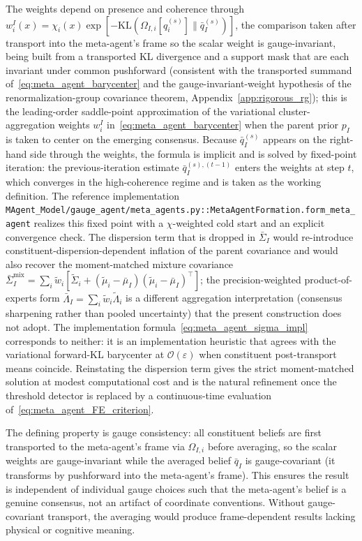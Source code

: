 \documentclass[11pt]{article}
\begin{document}
The weights depend on presence and coherence through $w_i^I(x) = \chi_i(x) \exp[-\mathrm{KL}(\Omega_{I,i}[q_i^{(s)}] \| \bar{q}_I^{(s)})]$, the comparison taken after transport into the meta-agent's frame so the scalar weight is gauge-invariant, being built from a transported KL divergence and a support mask that are each invariant under common pushforward (consistent with the transported summand of~\eqref{eq:meta_agent_barycenter} and the gauge-invariant-weight hypothesis of the renormalization-group covariance theorem, Appendix~\ref{app:rigorous_rg}); this is the leading-order saddle-point approximation of the variational cluster-aggregation weights $w_i^I$ in~\eqref{eq:meta_agent_barycenter} when the parent prior $p_I$ is taken to center on the emerging consensus. Because $\bar{q}_I^{(s)}$ appears on the right-hand side through the weights, the formula is implicit and is solved by fixed-point iteration: the previous-iteration estimate $\bar{q}_I^{(s),(t-1)}$ enters the weights at step $t$, which converges in the high-coherence regime and is taken as the working definition. The reference implementation \texttt{MAgent\_Model/gauge\_agent/meta\_agents.py::MetaAgentFormation.form\_meta\_agent} realizes this fixed point with a $\chi$-weighted cold start and an explicit convergence check. The dispersion term that is dropped in $\bar{\Sigma}_I$ would re-introduce constituent-dispersion-dependent inflation of the parent covariance and would also recover the moment-matched mixture covariance $\bar{\Sigma}_I^{\mathrm{mix}} = \sum_i \tilde{w}_i[\tilde{\Sigma}_i + (\tilde{\mu}_i - \bar{\mu}_I)(\tilde{\mu}_i - \bar{\mu}_I)^\top]$; the precision-weighted product-of-experts form $\bar\Lambda_I = \sum_i \tilde{w}_i \tilde{\Lambda}_i$ is a different aggregation interpretation (consensus sharpening rather than pooled uncertainty) that the present construction does not adopt. The implementation formula~\eqref{eq:meta_agent_sigma_impl} corresponds to neither: it is an implementation heuristic that agrees with the variational forward-KL barycenter at $\mathcal{O}(\varepsilon)$ when constituent post-transport means coincide. Reinstating the dispersion term gives the strict moment-matched solution at modest computational cost and is the natural refinement once the threshold detector is replaced by a continuous-time evaluation of~\eqref{eq:meta_agent_FE_criterion}.

The defining property is gauge consistency: all constituent beliefs are first transported to the meta-agent's frame via $\Omega_{I,i}$ before averaging, so the scalar weights are gauge-invariant while the averaged belief $\bar{q}_I$ is gauge-covariant (it transforms by pushforward into the meta-agent's frame). This ensures the result is independent of individual gauge choices such that the meta-agent's belief is a genuine consensus, not an artifact of coordinate conventions. Without gauge-covariant transport, the averaging would produce frame-dependent results lacking physical or cognitive meaning.
\end{document}
